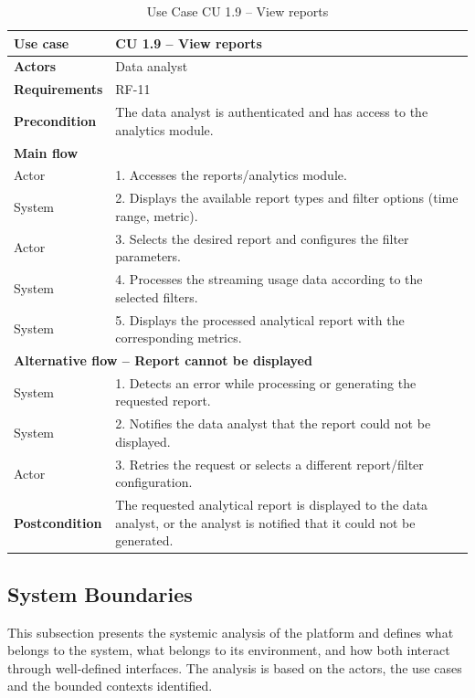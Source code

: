 \documentclass{article}
\begin{document}
\begin{table}[H]
\centering
\small
\renewcommand{\arraystretch}{1.35}
\caption{Use Case CU 1.9 -- View reports}
\label{tab:cu1.9}
\begin{tabularx}{\textwidth}{|l|X|}
\hline
\textbf{Use case} & CU 1.9 -- View reports \\ \hline
\textbf{Actors} & Data analyst \\ \hline
\textbf{Requirements} & RF-11 \\ \hline
\textbf{Precondition} & The data analyst is authenticated and has access to the analytics module. \\ \hline
\multicolumn{2}{|l|}{\textbf{Main flow}} \\ \hline
Actor & 1. Accesses the reports/analytics module. \\ \hline
System & 2. Displays the available report types and filter options (time range, metric). \\ \hline
Actor & 3. Selects the desired report and configures the filter parameters. \\ \hline
System & 4. Processes the streaming usage data according to the selected filters. \\ \hline
System & 5. Displays the processed analytical report with the corresponding metrics. \\ \hline
\multicolumn{2}{|l|}{\textbf{Alternative flow -- Report cannot be displayed}} \\ \hline
System & 1. Detects an error while processing or generating the requested report. \\ \hline
System & 2. Notifies the data analyst that the report could not be displayed. \\ \hline
Actor & 3. Retries the request or selects a different report/filter configuration. \\ \hline
\textbf{Postcondition} & The requested analytical report is displayed to the data analyst, or the analyst is notified that it could not be generated. \\ \hline
\end{tabularx}
\end{table}

\subsection{System Boundaries}
This subsection presents the systemic analysis of the platform and defines what belongs to the system, what belongs to its environment, and how both interact through well-defined interfaces. The analysis is based on the actors, the use cases and the bounded contexts identified.
\end{document}
